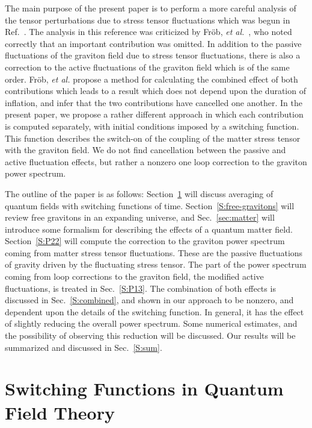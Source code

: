 \documentclass[preprint,prd,showpacs,superscriptaddress]{revtex4}
\begin{document}
The main purpose of the present paper is to perform a more careful analysis of the tensor perturbations due
to stress tensor fluctuations which was begun in Ref.~\cite{WHFN11}. The analysis in this reference was criticized 
by  Fr{\"o}b, {\it et al.}~\cite{FRV12}, who noted correctly that an important contribution was omitted. In addition to the
passive fluctuations of the graviton field due to stress tensor fluctuations, there is also a correction to the active
fluctuations of the graviton field which is of the same order. Fr{\"o}b, {\it et al.} propose a method for calculating the 
combined effect of both contributions which leads to a result which does not depend upon the duration of inflation,
and infer that the two contributions have cancelled one another. In the present paper, we propose a rather
different approach in which each contribution is computed separately, with initial conditions  imposed by a switching
function.  This function describes the switch-on of the coupling of the matter stress tensor with the graviton field. 
We do not find cancellation between the passive and active fluctuation effects, but rather a nonzero one loop
correction to the graviton power spectrum.

The outline of the paper is as follows: Section~\ref{sec:switch} will discuss averaging of quantum
fields with switching functions of time. Section~\ref{S:free-gravitons} will review free gravitons in an expanding universe,
and Sec.~\ref{sec:matter} will introduce some formalism for describing the effects of a quantum matter field.
Section~\ref{S:P22} will compute the correction to the graviton power spectrum coming from matter stress
tensor fluctuations. These are the passive fluctuations of gravity driven by the fluctuating stress tensor. The part
of the power spectrum coming from loop corrections to the graviton field, the modified active fluctuations, is treated
in Sec.~\ref{S:P13}. The combination of both effects is discussed in Sec.~\ref{S:combined}, and shown in our
approach to be nonzero, and dependent upon the details of the switching function. In general, it has the effect of
slightly reducing the overall power spectrum. Some numerical estimates, and the possibility of observing this reduction
will be discussed. Our results will be summarized and discussed in Sec.~\ref{S:sum}.




\section{Switching Functions in Quantum Field Theory}
\label{sec:switch}
\end{document}
